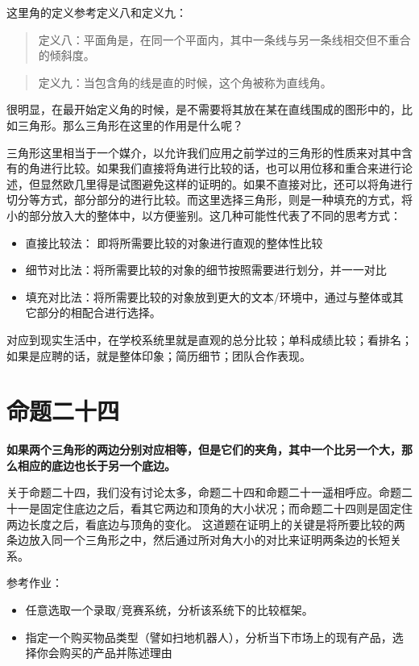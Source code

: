 \documentclass[
]{book}
\providecommand{\tightlist}{%
  \setlength{\itemsep}{0pt}\setlength{\parskip}{0pt}}
\begin{document}
这里角的定义参考定义八和定义九：

\begin{quote}
定义八：平面角是，在同一个平面内，其中一条线与另一条线相交但不重合的倾斜度。
\end{quote}

\begin{quote}
定义九：当包含角的线是直的时候，这个角被称为直线角。
\end{quote}

很明显，在最开始定义角的时候，是不需要将其放在某在直线围成的图形中的，比如三角形。那么三角形在这里的作用是什么呢？

三角形这里相当于一个媒介，以允许我们应用之前学过的三角形的性质来对其中含有的角进行比较。如果我们直接将角进行比较的话，也可以用位移和重合来进行论述，但显然欧几里得是试图避免这样的证明的。如果不直接对比，还可以将角进行切分等方式，部分部分的进行比较。而这里选择三角形，则是一种填充的方式，将小的部分放入大的整体中，以方便鉴别。这几种可能性代表了不同的思考方式：

\begin{itemize}
\tightlist
\item
  直接比较法： 即将所需要比较的对象进行直观的整体性比较
\item
  细节对比法：将所需要比较的对象的细节按照需要进行划分，并一一对比
\item
  填充对比法：将所需要比较的对象放到更大的文本/环境中，通过与整体或其它部分的相配合进行选择。
\end{itemize}

对应到现实生活中，在学校系统里就是直观的总分比较；单科成绩比较；看排名；如果是应聘的话，就是整体印象；简历细节；团队合作表现。

\hypertarget{ux547dux9898ux4e8cux5341ux56db}{%
\section{命题二十四}\label{ux547dux9898ux4e8cux5341ux56db}}

\textbf{如果两个三角形的两边分别对应相等，但是它们的夹角，其中一个比另一个大，那么相应的底边也长于另一个底边。}

关于命题二十四，我们没有讨论太多，命题二十四和命题二十一遥相呼应。命题二十一是固定住底边之后，看其它两边和顶角的大小状况；而命题二十四则是固定住两边长度之后，看底边与顶角的变化。
这道题在证明上的关键是将所要比较的两条边放入同一个三角形之中，然后通过所对角大小的对比来证明两条边的长短关系。

参考作业：

\begin{itemize}
\tightlist
\item
  任意选取一个录取/竞赛系统，分析该系统下的比较框架。
\item
  指定一个购买物品类型（譬如扫地机器人），分析当下市场上的现有产品，选择你会购买的产品并陈述理由
\end{itemize}
\end{document}
